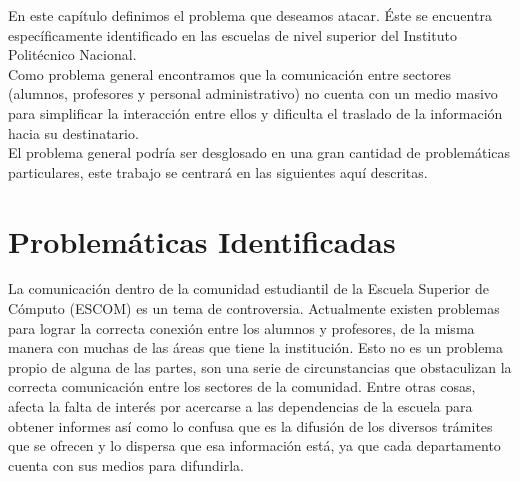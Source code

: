 	En este capítulo definimos el problema que deseamos atacar. Éste se encuentra específicamente identificado en las escuelas de nivel superior del Instituto Politécnico Nacional. \\
	Como problema general encontramos que la comunicación entre sectores (alumnos, profesores y personal administrativo) no cuenta con un medio masivo para simplificar la interacción entre ellos y dificulta el traslado de la información hacia su destinatario.\\
	El problema general podría ser desglosado en una gran cantidad de problemáticas particulares, este trabajo se centrará en las siguientes aquí descritas.
	\section{Problemáticas Identificadas}
	
		La comunicación dentro de la comunidad estudiantil de la Escuela Superior de Cómputo (ESCOM) es un tema de controversia. Actualmente existen problemas para lograr la correcta conexión entre los alumnos y profesores, de la misma manera con muchas de las áreas que tiene la institución. Esto no es un problema propio de alguna de las partes, son una serie de circunstancias que obstaculizan la correcta comunicación entre los sectores de la comunidad. Entre otras cosas, afecta la falta de interés por acercarse a las dependencias de la escuela para obtener informes así como lo confusa que es la difusión de los diversos trámites que se ofrecen y lo dispersa que esa información está, ya que cada departamento cuenta con sus medios para difundirla.\\
	
